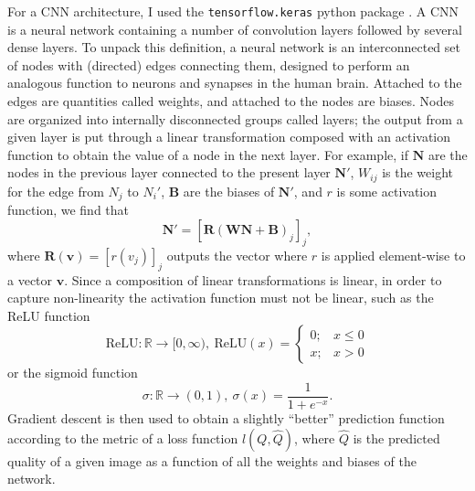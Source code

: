 \documentclass{article}
\begin{document}
For a CNN architecture, I used the \verb|tensorflow.keras| python package \cite{TensorFlowDocumentation}. A CNN is a neural network containing a number of convolution layers followed by several dense layers. To unpack this definition, a neural network is an interconnected set of nodes with (directed) edges connecting them, designed to perform an analogous function to neurons and synapses in the human brain. Attached to the edges are quantities called weights, and attached to the nodes are biases. Nodes are organized into internally disconnected groups called layers; the output from a given layer is put through a linear transformation composed with an activation function to obtain the value of a node in the next layer. For example, if $\mathbf N$ are the nodes in the previous layer connected to the present layer $\mathbf N'$, $W_{ij}$ is the weight for the edge from $N_j$ to $N_i'$, $\mathbf B$ are the biases of $\mathbf N'$, and $r$ is some activation function, we find that
\[\mathbf N' = [\mathbf R(\mathbf W\mathbf N+\mathbf B)_j]_j,\]
where $\mathbf R(\mathbf v)= [r(v_j)]_j$ outputs the vector where $r$ is applied element-wise to a vector $\mathbf v$. Since a composition of linear transformations is linear, in order to capture non-linearity the activation function must not be linear, such as the ReLU function
\[\text{ReLU}: \mathbb R \to [0,\infty),\ \text{ReLU}(x)=\begin{cases}
    0; & x \leq 0 \\
    x; & x > 0
\end{cases}\]
or the sigmoid function
\[\sigma: \mathbb R \to (0,1),\ \sigma(x)=\frac{1}{1+e^{-x}}.\]
Gradient descent is then used to obtain a slightly ``better'' prediction function according to the metric of a loss function $l(Q, \hat Q)$, where $\hat Q$ is the predicted quality of a given image as a function of all the weights and biases of the network.
\end{document}
